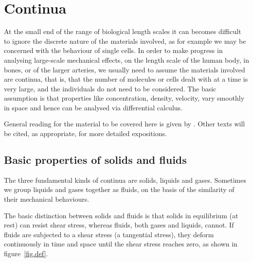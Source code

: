 \documentclass[twoside,11pt]		{report}
\begin{document}
\cleardoublepage

\chapter{Continua}
\label{ch.cont}


\lhead[\bfseries\thepage]{\rightmark}
\chead{}
\rhead[\leftmark]{\bfseries\thepage}
\cfoot{}{}

At the small end of the range of biological length scales it can
becomes difficult to ignore the discrete nature of the materials
involved, as for example we may be concerned with the behaviour of
single cells. In order to make progress in analysing large-scale
mechanical effects, \eg on the length scale of the human body, in
bones, or of the larger arteries, we usually need to assume the
materials involved are continua, that is, that the number of molecules
or cells dealt with at a time is very large, and the individuals do
not need to be considered.  The basic assumption is that properties
like concentration, density, velocity, vary smoothly in space and
hence can be analysed via differential calculus.

General reading for the material to be covered here is given by
\citet*{bgl95}. Other texts will be cited, as appropriate, for more
detailed expositions.

\section{Basic properties of solids and fluids}

The three fundamental kinds of continua are
solids, liquids and gases. Sometimes we group liquids and gases
together as fluids, on the basis of the similarity of their mechanical
behaviours.

The basic distinction between solids and fluids is that solids in
equilibrium (\ie at rest) can resist shear stress, whereas fluids,
both gases and liquids, cannot. If fluids are subjected to a shear
stress (\ie a tangential stress), they deform continuously in time and
space until the shear stress reaches zero, as shown in
figure~\ref{fig.def}.
\end{document}
